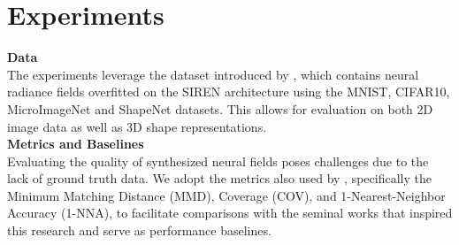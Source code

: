 \section{Experiments}
\label{sec:exper}
\textbf{Data}\\
The experiments leverage the dataset introduced by \cite{papa2023train}, which contains neural radiance fields overfitted on the SIREN architecture using the MNIST, CIFAR10, MicroImageNet and ShapeNet datasets. This allows for evaluation on both 2D image data as well as 3D shape representations. \\
\textbf{Metrics and Baselines}\\
Evaluating the quality of synthesized neural fields poses challenges due to the lack of ground truth data. We adopt the metrics also used by \cite{erkoç2023hyperdiffusion}, specifically the Minimum Matching Distance (MMD), Coverage (COV), and 1-Nearest-Neighbor Accuracy (1-NNA), to facilitate comparisons with the seminal works that inspired this research and serve as performance baselines. \\